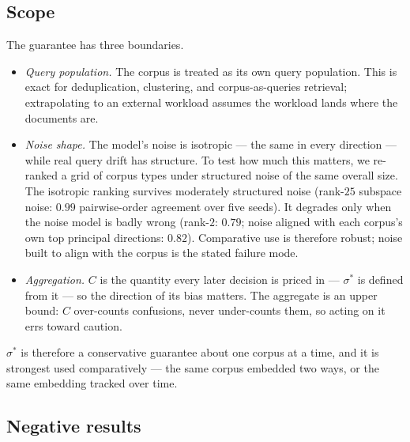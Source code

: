 \documentclass[11pt,letterpaper]{article}
\newcommand{\sstar}{\sigma^{*}}
\begin{document}
\subsection{Scope}

The guarantee has three boundaries.
\begin{itemize}
\item \emph{Query population.} The corpus is treated as its own query
  population. This is exact for deduplication, clustering, and
  corpus-as-queries retrieval; extrapolating to an external workload
  assumes the workload lands where the documents are.
\item \emph{Noise shape.} The model's noise is isotropic --- the same
  in every direction --- while real query drift has structure. To test
  how much this matters, we re-ranked a grid of corpus types under
  structured noise of the same overall size. The isotropic ranking
  survives moderately structured noise (rank-$25$ subspace noise: $0.99$
  pairwise-order agreement over five seeds). It degrades only when the
  noise model is badly wrong (rank-$2$: $0.79$; noise aligned with each
  corpus's own top principal directions: $0.82$). Comparative use is
  therefore robust; noise built to align with the corpus is the stated
  failure mode.
\item \emph{Aggregation.} $C$ is the quantity every later decision
  is priced in --- $\sstar$ is defined from it --- so the direction of
  its bias matters. The aggregate is an upper bound: $C$ over-counts
  confusions, never under-counts them, so acting on it errs toward
  caution.
\end{itemize}
$\sstar$ is therefore a conservative guarantee about one corpus at a
time, and it is strongest used comparatively --- the same corpus
embedded two ways, or the same embedding tracked over time.

\subsection{Negative results}
\label{sec:negative}
\end{document}

